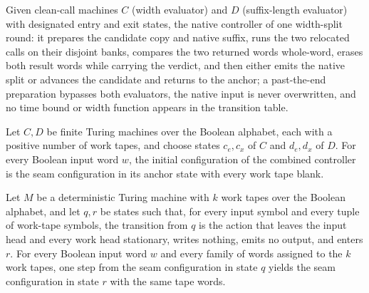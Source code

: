 \begin{definition}
\label{Turing.FinTM.emitterP2BodyTM}
\leanok
{}
Given clean-call machines $C$ (width evaluator) and $D$ (suffix-length
evaluator) with designated entry and exit states, the native controller of
one width-split round: it prepares the candidate copy and native suffix,
runs the two relocated calls on their disjoint banks, compares the two
returned words whole-word, erases both result words while carrying the
verdict, and then either emits the native split or advances the candidate
and returns to the anchor; a past-the-end preparation bypasses both
evaluators, the native input is never overwritten, and no time bound or
width function appears in the transition table.
\end{definition}

\begin{lemma}
\label{Turing.FinTM.emitterP2_body_start}
\leanok
{}
Let $C,D$ be finite Turing machines over the Boolean alphabet, each with a positive
number of work tapes, and choose states $c_e,c_x$ of $C$ and $d_e,d_x$ of $D$. For every
Boolean input word $w$, the initial configuration of the combined controller is the seam
configuration in its anchor state with every work tape blank.
\end{lemma}

\begin{lemma}
\label{Turing.FinTM.emitterP2_control}
\leanok
{}
Let $M$ be a deterministic Turing machine with $k$ work tapes over the Boolean alphabet,
and let $q,r$ be states such that, for every input symbol and every tuple of work-tape
symbols, the transition from $q$ is the action that leaves the input head and every work
head stationary, writes nothing, emits no output, and enters $r$. For every Boolean
input word $w$ and every family of words assigned to the $k$ work tapes, one step from
the seam configuration in state $q$ yields the seam configuration in state $r$ with the
same tape words.
\end{lemma}

